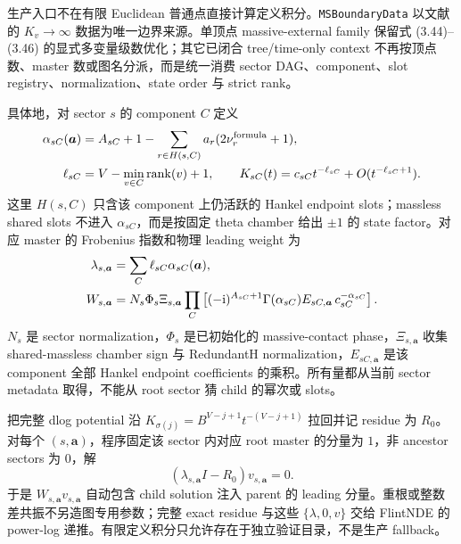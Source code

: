 \documentclass[11pt,a4paper]{ctexart}
\newcommand{\ii}{\mathrm i}
\begin{document}
生产入口不在有限 Euclidean 普通点直接计算定义积分。\texttt{MSBoundaryData} 以文献 \cite{Chen:2024jms} 的 $K_v\to\infty$ 数据为唯一边界来源。单顶点 massive-external family 保留式 (3.44)--(3.46) 的显式多变量级数优化；其它已闭合 tree/time-only context 不再按顶点数、master 数或图名分派，而是统一消费 sector DAG、component、slot registry、normalization、state order 与 strict rank。

具体地，对 sector $s$ 的 component $C$ 定义
\begin{align}
 \alpha_{sC}(\bm a)&=A_{sC}+1-
 \sum_{r\in H(s,C)}a_r(2\nu_r^{\rm formula}+1),
 \notag\\
 \ell_{sC}&=V-\min_{v\in C}\operatorname{rank}(v)+1,
 \qquad
 K_{sC}(t)=c_{sC}t^{-\ell_{sC}}+O(t^{-\ell_{sC}+1}).
 \label{eq:generic-sector-boundary-component}
\end{align}
这里 $H(s,C)$ 只含该 component 上仍活跃的 Hankel endpoint slots；massless shared slots 不进入 $\alpha_{sC}$，而是按固定 theta chamber 给出 $\pm1$ 的 state factor。对应 master 的 Frobenius 指数和物理 leading weight 为
\begin{align}
 \lambda_{s,\bm a}&=\sum_C\ell_{sC}\alpha_{sC}(\bm a),
 \notag\\
 W_{s,\bm a}&=N_s\Phi_s\Xi_{s,\bm a}
 \prod_C\left[
 (-\ii)^{A_{sC}+1}\Gamma(\alpha_{sC})
 E_{sC,\bm a}\,c_{sC}^{-\alpha_{sC}}
 \right].
 \label{eq:generic-sector-boundary-weight}
\end{align}
$N_s$ 是 sector normalization，$\Phi_s$ 是已初始化的 massive-contact phase，$\Xi_{s,\bm a}$ 收集 shared-massless chamber sign 与 RedundantH normalization，$E_{sC,\bm a}$ 是该 component 全部 Hankel endpoint coefficients 的乘积。所有量都从当前 sector metadata 取得，不能从 root sector 猜 child 的幂次或 slots。

把完整 dlog potential 沿 $K_{\sigma(j)}=B^{V-j+1}t^{-(V-j+1)}$ 拉回并记 residue 为 $R_0$。对每个 $(s,\bm a)$，程序固定该 sector 内对应 root master 的分量为 $1$，非 ancestor sectors 为 $0$，解
\begin{equation}
 (\lambda_{s,\bm a}I-R_0)v_{s,\bm a}=0.
 \label{eq:generic-sector-indicial-vector}
\end{equation}
于是 $W_{s,\bm a}v_{s,\bm a}$ 自动包含 child solution 注入 parent 的 leading 分量。重根或整数差共振不另造图专用参数；完整 exact residue 与这些 $\{\lambda,0,v\}$ 交给 FlintNDE 的 power-log 递推。有限定义积分只允许存在于独立验证目录，不是生产 fallback。
\end{document}
